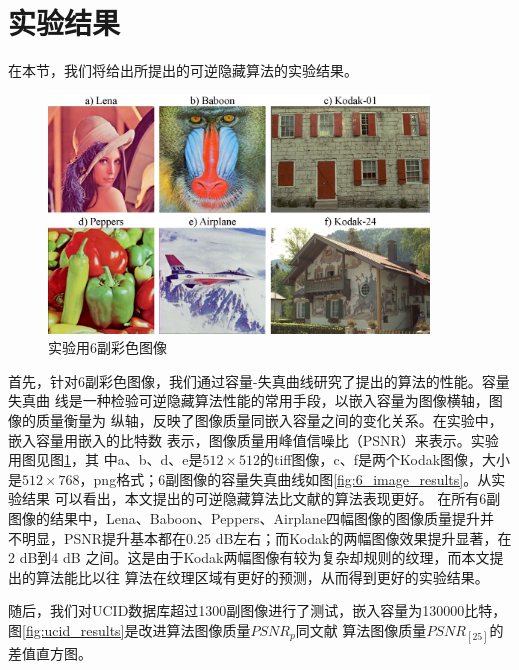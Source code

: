 \section{实验结果}
\par
在本节，我们将给出所提出的可逆隐藏算法的实验结果。
\begin{figure}[!h]
  \centering 
  \includegraphics[width=0.9\textwidth]{figures/exp_images.eps}
  \caption{实验用6副彩色图像}
  \label{fig:exp_images}
\end{figure}
\vspace{-7mm}
\par
首先，针对6副彩色图像，我们通过容量-失真曲线研究了提出的算法的性能。容量失真曲
线是一种检验可逆隐藏算法性能的常用手段，以嵌入容量为图像横轴，图像的质量衡量为
纵轴，反映了图像质量同嵌入容量之间的变化关系。在实验中，嵌入容量用嵌入的比特数
表示，图像质量用峰值信噪比（PSNR）来表示。实验用图见图\ref{fig:exp_images}，其
中a、b、d、e是$512\times 512$的tiff图像，c、f是两个Kodak图像，大小是$512\times
768$，png格式；6副图像的容量失真曲线如图\ref{fig:6_image_results}。从实验结果
可以看出，本文提出的可逆隐藏算法比文献\cite{li2013reversible}的算法表现更好。
在所有6副图像的结果中，Lena、Baboon、Peppers、Airplane四幅图像的图像质量提升并
不明显，PSNR提升基本都在0.25 dB左右；而Kodak的两幅图像效果提升显著，在2 dB到4 dB
之间。这是由于Kodak两幅图像有较为复杂却规则的纹理，而本文提出的算法能比以往
算法在纹理区域有更好的预测，从而得到更好的实验结果。
\par
随后，我们对UCID数据库超过1300副图像进行了测试，嵌入容量为130000比特，
图\ref{fig:ucid_results}是改进算法图像质量$PSNR_p$同文献\cite{li2013reversible}
算法图像质量$PSNR_{[25]}$的差值直方图。
